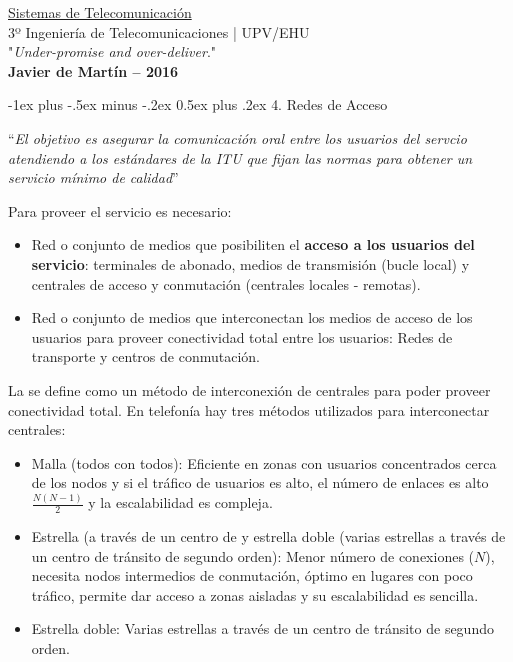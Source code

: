 \documentclass[10pt,portrait, twocolumn]{article}
\makeatletter
\renewcommand{\section}{\@startsection{section}{1}{0mm}%
                                {-1ex plus -.5ex minus -.2ex}%
                                {0.5ex plus .2ex}%
                                {\normalfont\large\bfseries}}
\makeatother
\begin{document}
\begin{framed}
	\begin{center}
    	\Large{\underline{Sistemas de Telecomunicación}} \\
    	\scriptsize{3º Ingeniería de Telecomunicaciones | UPV/EHU}\\
     	"\textsl{Under-promise and over-deliver}." \\
     	\small{\textbf{Javier de Martín -- 2016}}
	\end{center}
\end{framed}


\hrulefill

\section{4. Redes de Acceso}

\hrulefill

``\textit{El objetivo es asegurar la comunicación oral entre los usuarios del servcio atendiendo a los estándares de la ITU que fijan las normas para obtener un servicio mínimo de calidad}''

Para proveer el servicio es necesario:

\begin{itemize}
	\item Red o conjunto de medios que posibiliten el \textbf{acceso a los usuarios del servicio}: terminales de abonado, medios de transmisión (bucle local) y centrales de acceso y conmutación (centrales locales - remotas).
	\item Red o conjunto de medios que interconectan los medios de acceso de los usuarios para proveer conectividad total entre los usuarios: Redes de transporte y centros de conmutación.
\end{itemize}

La  se define como un método de interconexión de centrales para poder proveer conectividad total. En telefonía hay tres métodos utilizados para interconectar centrales:

	\begin{itemize}
		\item Malla (todos con todos): Eficiente en zonas con usuarios concentrados cerca de los nodos y si el tráfico de usuarios es alto, el número de enlaces es alto $\frac{N(N-1)}{2}$ y la escalabilidad es compleja.
		\item Estrella (a través de un centro de y estrella doble (varias estrellas a través de un centro de tránsito de segundo orden): Menor número de conexiones ($N$), necesita nodos intermedios de conmutación, óptimo en lugares con poco tráfico, permite dar acceso a zonas aisladas y su escalabilidad es sencilla.
		\item Estrella doble: Varias estrellas a través de un centro de tránsito de segundo orden.
	\end{itemize}
\end{document}
